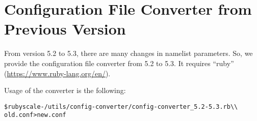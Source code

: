 \section{Configuration File Converter from Previous Version}

From version 5.2 to 5.3, there are many changes in namelist parameters.
So, we provide the configuration file converter from 5.2 to 5.3.
It requires ``ruby'' (\url{https://www.ruby-lang.org/en/}).

Usage of the converter is the following:\\
\begin{alltt}
 \$ ruby scale-{\version}/utils/config-converter/config-converter_5.2-5.3.rb \verb|\\|
        old.conf > new.conf
\end{alltt}
